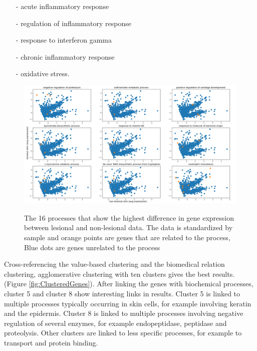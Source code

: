 \documentclass[10pt,a4paper]{article}
\begin{document}
	\begin{enumerate}
		\item[-] acute inflammatory response
		\item[-] regulation of inflammatory response 
		\item[-] response to interferon gamma 
		\item[-] chronic inflammatory response
		\item[-] oxidative stress.
	\end{enumerate}
	
	\begin{figure}[H]
	\includegraphics[width=1\textwidth]{Sign_Processes_Psoriasis3x3.png}
	\label{fig:ProcessesScaledBySample}
	\caption{The 16 processes that show the highest difference in gene expression between lesional and non-lesional data. The data is standardized by sample and orange points are genes that are related to the process, Blue dots are genes unrelated to the process}
\end{figure}	
	
	Cross-referencing the value-based clustering and the biomedical relation clustering, agglomerative clustering with ten clusters gives the best results.(Figure \ref{fig:ClusteredGenes}). After linking the genes with biochemical processes, cluster 5 and cluster 8 show interesting links in results. Cluster 5 is linked to multiple processes typically occurring in skin cells, for example involving keratin and the epidermis. Cluster 8 is linked to multiple processes involving negative regulation of several enzymes, for example endopeptidase, peptidase and proteolysis. Other clusters are linked to less specific processes, for example to transport and protein binding.
	
\end{document}

